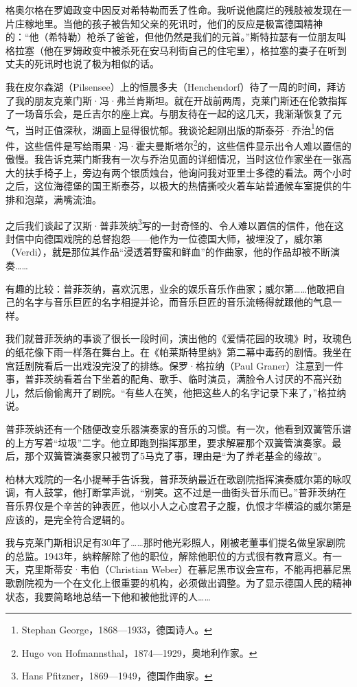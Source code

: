 \documentclass[UTF8]{ctexart}
\begin{document}
格奥尔格在罗姆政变中因反对希特勒而丢了性命。我听说他腐烂的残肢被发现在一片庄稼地里。当他的孩子被告知父亲的死讯时，他们的反应是极富德国精神的：“他（希特勒）枪杀了爸爸，但他仍然是我们的元首。”斯特拉瑟有一位朋友叫格拉塞（他在罗姆政变中被杀死在安马利街自己的住宅里），格拉塞的妻子在听到丈夫的死讯时也说了极为相似的话。

我在皮尔森湖（Pilsensee）上的恒晨多夫（Henchendorf）待了一周的时间，拜访了我的朋友克莱门斯·冯·弗兰肯斯坦。就在开战前两周，克莱门斯还在伦敦指挥了一场音乐会，是丘吉尔的座上宾。与朋友待在一起的这几天，我渐渐恢复了元气，当时正值深秋，湖面上显得很忧郁。我谈论起刚出版的斯泰芬·乔治\footnote{Stephan George，1868—1933，德国诗人。}的信件，这些信件是写给雨果·冯·霍夫曼斯塔尔\footnote{Hugo von Hofmannsthal，1874—1929，奥地利作家。}的，这些信件显示出令人难以置信的傲慢。我告诉克莱门斯我有一次与乔治见面的详细情况，当时这位作家坐在一张高大的扶手椅子上，旁边有两个银质烛台，他询问我对亚里士多德的看法。两个小时之后，这位海德堡的国王斯泰芬，以极大的热情撕咬火着车站普通候车室提供的牛排和泡菜，满嘴流油。

之后我们谈起了汉斯·普菲茨纳\footnote{Hans Pfitzner，1869—1949，德国作曲家。}写的一封奇怪的、令人难以置信的信件，他在这封信中向德国戏院的总督抱怨——他作为一位德国大师，被埋没了，威尔第（Verdi），就是那位其作品“浸透着野蛮和鲜血”的作曲家，他的作品却被不断演奏……

有趣的比较：普菲茨纳，喜欢沉思，业余的娱乐音乐作曲家；威尔第……他敢把自己的名字与音乐巨匠的名字相提并论，而音乐巨匠的音乐流畅得就跟他的气息一样。

我们就普菲茨纳的事谈了很长一段时间，演出他的《爱情花园的玫瑰》时，玫瑰色的纸花像下雨一样落在舞台上。在《帕莱斯特里纳》第二幕中毒药的剧情。我坐在宫廷剧院看后一出戏没完没了的排练。保罗·格拉纳（Paul Graner）注意到一件事，普菲茨纳看着台下坐着的配角、歌手、临时演员，满脸令人讨厌的不高兴劲儿，然后偷偷离开了剧院。“有些人在笑，他把这些人的名字记录下来了，”格拉纳说。

普菲茨纳还有一个随便改变乐器演奏家的音乐的习惯。有一次，他看到双簧管乐谱的上方写着“垃圾”二字。他立即跑到指挥那里，要求解雇那个双簧管演奏家。最后，那个双簧管演奏家只被罚了5马克了事，理由是“为了养老基金的缘故”。

柏林大戏院的一名小提琴手告诉我，普菲茨纳最近在歌剧院指挥演奏威尔第的咏叹调，有人鼓掌，他打断掌声说，“别笑。这不过是一曲街头音乐而已。”普菲茨纳在音乐界仅是个辛苦的钟表匠，他以小人之心度君子之腹，仇恨才华横溢的威尔第是应该的，是完全符合逻辑的。

我与克莱门斯相识足有30年了……那时他光彩照人，刚被老董事们提名做皇家剧院的总监。1943年，纳粹解除了他的职位，解除他职位的方式很有教育意义。有一天，克里斯蒂安·韦伯（Christian Weber）在慕尼黑市议会宣布，不能再把慕尼黑歌剧院视为一个在文化上很重要的机构，必须做出调整。为了显示德国人民的精神状态，我要简略地总结一下他和被他批评的人……
\end{document}
